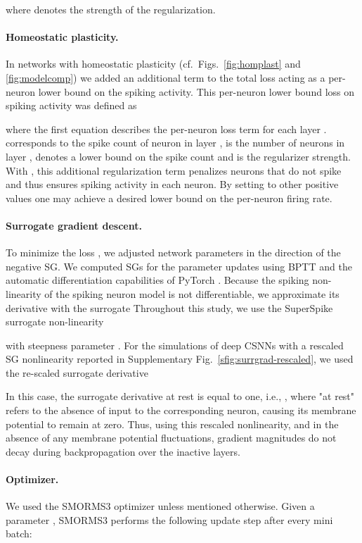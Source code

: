\documentclass[11pt,a4paper]{article}
\begin{document}
where  denotes the strength of the regularization.

\paragraph{Homeostatic plasticity.} In networks with homeostatic
plasticity (cf.\ Figs.~\ref{fig:homplast} and \ref{fig:modelcomp}) we added an additional term
to the total loss acting as a per-neuron
lower bound on the spiking activity. This per-neuron lower bound loss on
spiking activity  was defined as

where the first equation describes the per-neuron loss term for each layer .
 corresponds to the spike count of neuron  in layer ,
 is the number of neurons in layer ,  denotes a
lower bound on the spike count and  is the
regularizer strength. \\
With , this additional regularization term penalizes
neurons that do not spike and thus ensures spiking activity in each neuron. By setting  to other
positive values one may achieve a desired lower bound on the per-neuron firing rate.

\paragraph{Surrogate gradient descent.} 
To minimize the loss , we adjusted network parameters in the direction of the negative \ac{SG}. 
We computed \acp{SG} for the parameter updates using \ac{BPTT} and the automatic differentiation capabilities of PyTorch \citep{NEURIPS2019_9015}. 
Because the spiking non-linearity of the spiking neuron model is not differentiable, we approximate its derivative 
with the surrogate 
Throughout this study, we use the SuperSpike surrogate non-linearity \citep{Zenke2018-id}

with steepness parameter .
For the simulations of deep \acp{CSNN} with a rescaled \ac{SG} nonlinearity reported in Supplementary Fig.~\ref{sfig:surrgrad-rescaled}, we used the re-scaled surrogate derivative 


In this case, the surrogate derivative at rest is equal to one, i.e., , where "at rest" refers to the absence of input to the corresponding neuron, causing its membrane potential to remain at zero. Thus, using this rescaled nonlinearity, and in the absence of any membrane potential fluctuations, gradient magnitudes do not decay during backpropagation over the inactive layers.

\paragraph{Optimizer.}
We used the SMORMS3 optimizer \cite{Funk2015-xl} unless mentioned otherwise. Given a parameter , SMORMS3 performs the following update step after every mini batch:
\end{document}
